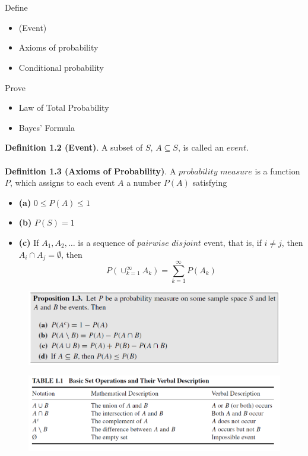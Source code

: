 \documentclass[12pt,a4paper]{report}
\author{Frederik Appel Vardinghus-Nielsen}
\begin{document}
\\\\
Define
\begin{itemize}
\setlength\itemsep{0em}
\item (Event)
\item Axioms of probability
\item Conditional probability
\end{itemize}
Prove
\begin{itemize}
\setlength\itemsep{0em}
\item Law of Total Probability
\item Bayes' Formula
\end{itemize}
\textbf{Definition 1.2 (Event)}. A subset of $S$, $A\subseteq S$, is called an $event$.\\\\
\noindent \textbf{Definition 1.3 (Axioms of Probability)}. A $probability$ $measure$ is a function $P$, which assigns to each event $A$ a number $P(A)$ satisfying
\begin{itemize}
\item \textbf{(a)} $0\leq P(A) \leq 1$
\item \textbf{(b)} $P(S)=1$
\item \textbf{(c)} If $A_1,A_2,\ldots$ is a sequence of $pairwise$ $disjoint$ event, that is, if $i\neq j$, then $A_i\cap A_j=\emptyset$, then
\begin{equation}
P\left(\cup_{k=1}^{\infty}A_k\right)=\sum_{k=1}^{\infty}P(A_k)
\end{equation}
\end{itemize}
\begin{figure}[H]
\centering
\includegraphics[width=\textwidth]{figures/regneregler.png}
\end{figure}
\begin{figure}[H]
\centering
\includegraphics[width=\textwidth]{figures/begreber.png}
\end{figure}
\end{document}
